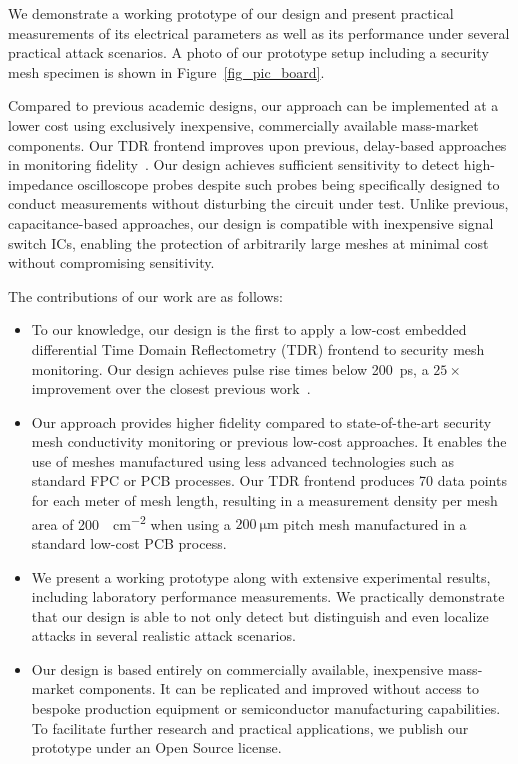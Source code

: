 \documentclass[final]{iacrtrans}
\begin{document}
We demonstrate a working prototype of our design and present practical measurements of its electrical parameters as well
as its performance under several practical attack scenarios. A photo of our prototype setup including a security mesh
specimen is shown in Figure\ \ref{fig_pic_board}.

Compared to previous academic designs, our approach can be implemented at a lower cost using exclusively inexpensive,
commercially available mass-market components. Our TDR frontend improves upon previous, delay-based approaches in
monitoring fidelity~\cite{vasileActiveTamperDetection2017,vasileTemperatureSensitiveActive2017}. Our design achieves
sufficient sensitivity to detect high-impedance oscilloscope probes despite such probes being specifically designed to
conduct measurements without disturbing the circuit under test. Unlike previous, capacitance-based approaches, our
design is compatible with inexpensive signal switch ICs, enabling the protection of arbitrarily large meshes at minimal
cost without compromising sensitivity.

The contributions of our work are as follows:

\begin{itemize}
    \item To our knowledge, our design is the first to apply a low-cost embedded differential Time Domain Reflectometry
        (TDR) frontend to security mesh monitoring. Our design achieves pulse rise times below \qty{200}{\pico\second},
        a $25\times$ improvement over the closest previous
        work~\cite{vasileActiveTamperDetection2017,vasileTemperatureSensitiveActive2017}.
    \item Our approach provides higher fidelity compared to state-of-the-art security mesh conductivity monitoring or
        previous low-cost approaches. It enables the use of meshes manufactured using less advanced technologies such as
        standard FPC or PCB processes. Our TDR frontend produces 70 data points for each meter of mesh length, resulting
        in a measurement density per mesh area of \qty{200}{\bit\per\centi\meter^2} when using a
        $\qty{200}{\micro\meter}$ pitch mesh manufactured in a standard low-cost PCB process.
    \item We present a working prototype along with extensive experimental results, including laboratory performance
        measurements. We practically demonstrate that our design is able to not only detect but distinguish and even
        localize attacks in several realistic attack scenarios.
    \item Our design is based entirely on commercially available, inexpensive mass-market components. It can be
        replicated and improved without access to bespoke production equipment or semiconductor manufacturing
        capabilities. To facilitate further research and practical applications, we publish our prototype under an Open
        Source license.
\end{itemize}        
\end{document}
